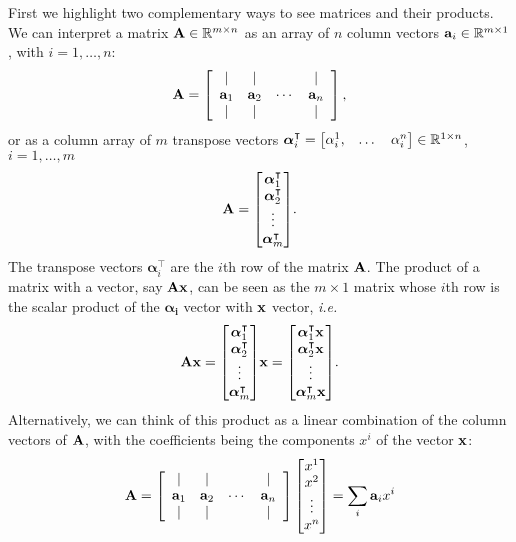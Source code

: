 \documentclass{article}
\begin{document}
First we highlight two complementary ways to see matrices and their products. We can interpret a matrix $\vb{A}\in \mathbb{R}^{m\times n}$ as an array of $n$ column vectors $\vb{a}_i\in\mathbb{R}^{m\times 1}$,  with $i=1,\dots,n$:
\begin{equation}
   \vb{A}=\left[\begin{array}{cccc}
    \mid & \mid & & \mid \\
    \vb{a}_{1} & \vb{a}_{2} & \cdots & \vb{a}_{n} \\
    \mid & \mid & & \mid
    \end{array}\right],
\end{equation}
or as a column array of $m$ transpose vectors $\boldsymbol{\alpha}_i^\intercal=\mqty[\alpha_i^1, & \dots & \alpha_i^n]\in\mathbb{R}^{1\times n}$, $i=1,\dots, m$
\begin{equation}
    \vb{A} = \mqty[\boldsymbol{\alpha}_1^\intercal \\ \boldsymbol{\alpha}_2^\intercal \\ \vdots \\ \boldsymbol{\alpha}_m^\intercal].
\end{equation}
The transpose vectors $\boldsymbol{\alpha}_i^\intercal$ are the $i$th row of the matrix $\vb{A}$.
The product of a matrix with a vector, say $\vb{Ax}$,  can be seen as the $m\times 1$ matrix whose $i$th row is the scalar product of the $\boldsymbol{\alpha_i}$ vector with $\vb{x}$ vector, \textit{i.e.}
\begin{equation}
    \vb{Ax} = \mqty[\boldsymbol{\alpha}_1^\intercal \\ \boldsymbol{\alpha}_2^\intercal \\ \vdots \\ \boldsymbol{\alpha}_m^\intercal] \vb{ x} = \mqty[\boldsymbol{\alpha}_1^\intercal \vb{x}\\ \boldsymbol{\alpha}_2^\intercal \vb{x}\\ \vdots \\ \boldsymbol{\alpha}_m^\intercal\vb{x}].
\end{equation}
Alternatively, we can think of this product as a linear combination of the column vectors of $\vb{A}$, with the coefficients being the components $x^i$ of the vector $\vb{x}$:
\begin{equation}
   \vb{A}=\left[\begin{array}{cccc}
    \mid & \mid & & \mid \\
    \vb{a}_{1} & \vb{a}_{2} & \cdots & \vb{a}_{n} \\
    \mid & \mid & & \mid
    \end{array}\right]\mqty[x^1 \\ x^2 \\ \vdots \\ x^n] = \sum_i \vb{a}_i x^i
\end{equation}
\end{document}
